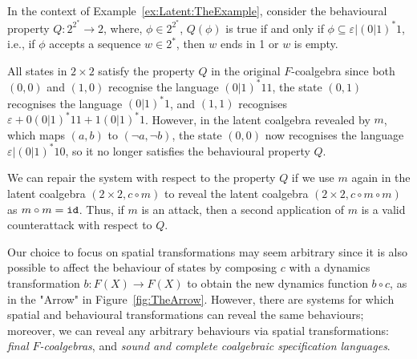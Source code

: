 \begin{example}
    In the context of Example~\ref{ex:Latent:TheExample}, consider the behavioural property $Q\colon 2^{2^*}\rightarrow 2$, where, $\phi \in 2^{2^*}$, $Q(\phi)$ is true if and only if $\phi\subseteq \varepsilon | (0|1)^*1$, i.e., if $\phi$ accepts a sequence $w\in 2^*$, then $w$ ends in 1 or $w$ is empty. 

   All states in $2\times 2$ satisfy the property $Q$ in the original $F$-coalgebra since both $(0,0)$ and $(1,0)$ recognise the language $(0|1)^*11$, the state $(0,1)$ recognises the language $(0|1)^*1$, and $(1,1)$ recognises $\varepsilon + 0(0|1)^*11 + 1(0|1)^*1$. 
   However, in the latent coalgebra revealed by $m$, which maps $(a,b)$ to $(\lnot a, \lnot b)$, the state $(0,0)$ now recognises the language $\varepsilon|(0|1)^*10$, so it no longer satisfies the behavioural property $Q$.

    We can repair the system with respect to the property $Q$ if we use $m$ again in the latent coalgebra $(2\times 2, c\circ m)$ to reveal the latent coalgebra $(2\times 2, c\circ m\circ m)$ as $m \circ m={\texttt{id}}$. Thus, if $m$ is an attack, then a second application of $m$ is a valid counterattack with respect to $Q$. 
\end{example}

Our choice to focus on spatial transformations may seem arbitrary since it is also possible to affect the behaviour of states by composing $c$ with a {dynamics transformation} $b\colon F(X)\rightarrow F(X)$ to obtain the new dynamics function $b \circ c$, as in the "Arrow" in Figure~\ref{fig:TheArrow}. %
However, there are systems for which spatial and behavioural transformations can reveal the same behaviours; moreover, we can reveal any arbitrary behaviours via spatial transformations: \emph{final $F$-coalgebras}, and \emph{sound and complete coalgebraic specification languages}.

